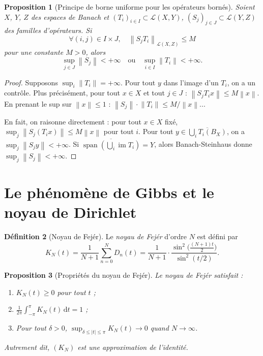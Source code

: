 \documentclass[a4paper,12pt]{book}
\DeclareMathOperator{\im}{im}
\DeclareMathOperator{\spn}{span}
\newcommand{\dd}{\mathrm{d}}
\newcommand{\norm}[1]{\left\| #1 \right\|}
\newcommand{\abs}[1]{\left| #1 \right|}
\theoremstyle{definition}
\newtheorem{definition}{Définition}[chapter]
\theoremstyle{plain}
\newtheorem{proposition}[definition]{Proposition}
\theoremstyle{remark}
\begin{document}
\begin{proposition}[Principe de borne uniforme pour les opérateurs bornés]
\label{prop:PBU-operateurs}
Soient $X$, $Y$, $Z$ des espaces de Banach et $(T_i)_{i \in I} \subset \mathcal{L}(X,Y)$,
$(S_j)_{j \in J} \subset \mathcal{L}(Y,Z)$ des familles d'opérateurs. Si
\[
  \forall (i,j) \in I \times J, \quad \norm{S_j T_i}_{\mathcal{L}(X,Z)} \leq M
\]
pour une constante $M > 0$, alors
\[
  \sup_{j \in J} \norm{S_j} < +\infty \quad \text{ou} \quad
  \sup_{i \in I} \norm{T_i} < +\infty.
\]
\end{proposition}

\begin{proof}
Supposons $\sup_i \norm{T_i} = +\infty$. Pour tout $y$ dans l'image
d'un $T_i$, on a un contrôle. Plus précisément, pour tout $x \in X$ et
tout $j \in J$ : $\norm{S_j T_i x} \leq M \norm{x}$. En prenant le sup
sur $\norm{x} \leq 1$ : $\norm{S_j} \cdot \norm{T_i} \leq M / \norm{x}$...

En fait, on raisonne directement : pour tout $x \in X$ fixé,
$\sup_j \norm{S_j(T_i x)} \leq M\norm{x}$ pour tout $i$. Pour tout
$y \in \overline{\bigcup_i T_i(B_X)}$, on a $\sup_j \norm{S_j y} < +\infty$.
Si $\overline{\spn(\bigcup_i \im T_i)} = Y$, alors Banach-Steinhaus donne
$\sup_j \norm{S_j} < +\infty$.
\end{proof}


\section{Le phénomène de Gibbs et le noyau de Dirichlet}
\label{sec:gibbs}


\begin{definition}[Noyau de Fejér]
\label{def:noyau-fejer}
Le \emph{noyau de Fejér} d'ordre $N$ est défini par
\[
  K_N(t) = \frac{1}{N+1} \sum_{n=0}^{N} D_n(t)
  = \frac{1}{N+1} \cdot \frac{\sin^2\bigl(\frac{(N+1)t}{2}\bigr)}{\sin^2(t/2)}.
\]
\end{definition}

\begin{proposition}[Propriétés du noyau de Fejér]
\label{prop:fejer-proprietes}
Le noyau de Fejér satisfait :
\begin{enumerate}[label=(\roman*)]
  \item $K_N(t) \geq 0$ pour tout $t$ ;
  \item $\frac{1}{2\pi}\int_{-\pi}^{\pi} K_N(t)\, \dd t = 1$ ;
  \item Pour tout $\delta > 0$, $\sup_{\delta \leq \abs{t} \leq \pi} K_N(t) \to 0$ quand $N \to \infty$.
\end{enumerate}
Autrement dit, $(K_N)$ est une \emph{approximation de l'identité}.
\end{proposition}
\end{document}
